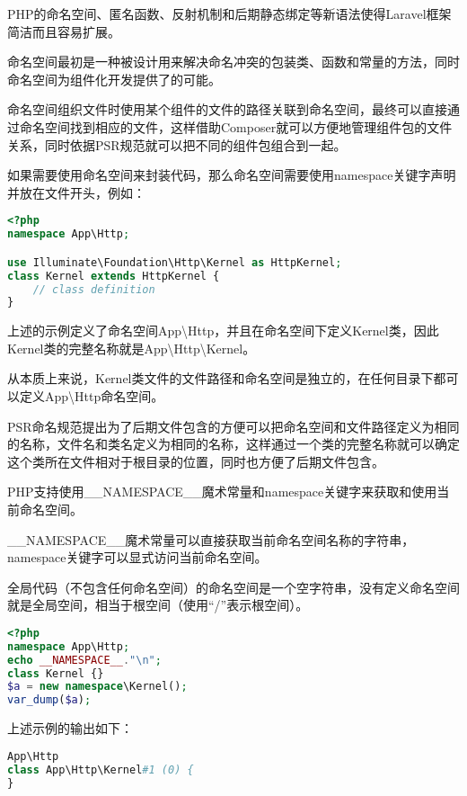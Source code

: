 PHP的命名空间、匿名函数、反射机制和后期静态绑定等新语法使得Laravel框架简洁而且容易扩展。

命名空间最初是一种被设计用来解决命名冲突的包装类、函数和常量的方法，同时命名空间为组件化开发提供了的可能。

命名空间组织文件时使用某个组件的文件的路径关联到命名空间，最终可以直接通过命名空间找到相应的文件，这样借助Composer就可以方便地管理组件包的文件关系，同时依据PSR规范就可以把不同的组件包组合到一起。

如果需要使用命名空间来封装代码，那么命名空间需要使用namespace关键字声明并放在文件开头，例如：

\begin{lstlisting}[language=PHP]
<?php
namespace App\Http;

use Illuminate\Foundation\Http\Kernel as HttpKernel;
class Kernel extends HttpKernel {
    // class definition
}
\end{lstlisting}

上述的示例定义了命名空间App\textbackslash Http，并且在命名空间下定义Kernel类，因此Kernel类的完整名称就是App\textbackslash Http\textbackslash Kernel。

从本质上来说，Kernel类文件的文件路径和命名空间是独立的，在任何目录下都可以定义App\textbackslash Http命名空间。

PSR命名规范提出为了后期文件包含的方便可以把命名空间和文件路径定义为相同的名称，文件名和类名定义为相同的名称，这样通过一个类的完整名称就可以确定这个类所在文件相对于根目录的位置，同时也方便了后期文件包含。

PHP支持使用\_\_NAMESPACE\_\_魔术常量和namespace关键字来获取和使用当前命名空间。

\_\_NAMESPACE\_\_魔术常量可以直接获取当前命名空间名称的字符串，namespace关键字可以显式访问当前命名空间。

全局代码（不包含任何命名空间）的命名空间是一个空字符串，没有定义命名空间就是全局空间，相当于根空间（使用“/”表示根空间）。






\begin{lstlisting}[language=PHP]
<?php
namespace App\Http;
echo __NAMESPACE__."\n";
class Kernel {}
$a = new namespace\Kernel();
var_dump($a);
\end{lstlisting}

上述示例的输出如下：

\begin{lstlisting}[language=PHP]
App\Http
class App\Http\Kernel#1 (0) {
}
\end{lstlisting}


